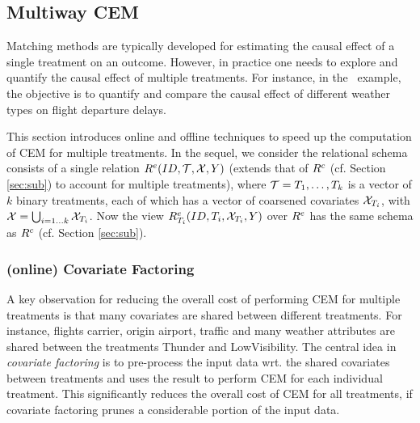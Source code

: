 \vspace{-.1cm}
\subsection{Multiway CEM}

\label{sec:mte}

Matching methods are typically developed for estimating the causal effect of a single treatment
on an outcome. However, in practice one needs
to explore and quantify the causal effect of multiple treatments.
For instance, in the \delay \ example, the objective is to quantify and compare the causal effect
of different weather types on flight departure delays.

This section introduces online and offline techniques to speed up the computation of  CEM
for multiple treatments.  In the sequel, we consider the relational schema consists of a single relation ${{R}^e}(ID,{{\mathcal{T}}},{{\mathcal{X}}},Y)$ (extends that of ${{R}^c}$ (cf. Section \ref{sec:sub}) to account for multiple treatments), where ${{\mathcal{T}}}=T_1, \ldots, T_k$ is a vector of $k$ binary
treatments, each of which has a vector of coarsened covariates ${{\mathcal{X}}}_{T_i}$, with ${{\mathcal{X}}}= \bigcup_{i=1 \ldots k} {{\mathcal{X}}}_{T_i}$.
Now the view ${{R}^e_{T_i}}(ID,T_i,{{\mathcal{X}}}_{T_i},Y)$ over ${{R}^e}$ has the same schema
as ${{R}^c}$ (cf. Section \ref{sec:sub}). 


\vspace{-.2cm}

\subsubsection{(online) Covariate Factoring}

A key observation for reducing the overall cost of performing CEM for multiple treatments is that
many covariates are shared between different treatments. For instance, flights carrier, origin airport, traffic and many weather attributes are shared between the treatments Thunder and LowVisibility. The central idea in {\em covariate factoring}  is to pre-process the input data
wrt.  the shared covariates between treatments and uses the result to perform CEM
for each individual treatment. This  significantly reduces the overall cost of CEM for all treatments,
if covariate factoring prunes a considerable portion of the input data.


